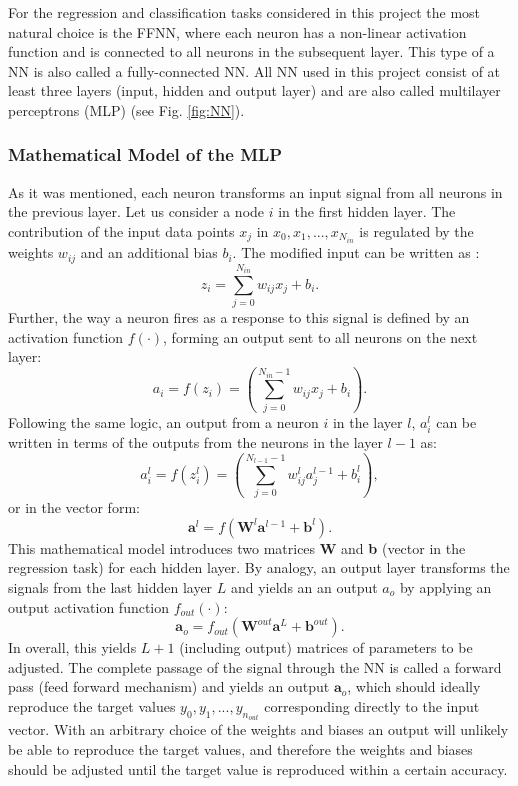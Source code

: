 \documentclass{emulateapj}
\begin{document}
For the regression and classification tasks considered in this project the most natural choice is the FFNN, where each neuron has a non-linear activation function and is connected to all neurons in the subsequent layer. This type of a NN is also called a fully-connected NN. All NN used in this project consist of at least three layers (input, hidden and output layer) and are also called multilayer perceptrons (MLP) (see Fig. \ref{fig:NN}).

\subsubsection{Mathematical Model of the MLP}
\label{subsubsec: MLP}

As it was mentioned, each neuron transforms an input signal from all neurons in the previous layer. Let us consider a node $i$ in the first hidden layer. The contribution of the input data points $x_j$ in $x_0, x_1, ..., x_{N_{in}}$ is regulated by the weights $w_{ij}$ and an additional bias $b_i$. The modified input can be written as \cite{Morten}:
\begin{equation}
\label{eq: 1}
    z_i = \sum_{j=0}^{N_{in}}w_{ij}x_j +b_i.
\end{equation}
Further, the way a neuron fires as a response to this signal is defined by an activation function $f(\cdot)$, forming an output sent to all neurons on the next layer:
\begin{equation}
    a_i = f\left(z_i\right)=\left(\sum_{j=0}^{N_{in}-1}w_{ij}x_j +b_i\right).
\end{equation}
Following the same logic, an output from a neuron $i$ in the layer $l$, $a_i^l$ can be written in terms of the outputs from the neurons in the layer $l-1$ as:
\begin{equation}
    a_i^l = f\left(z_i^l\right)=\left(\sum_{j=0}^{N_{l-1}-1}w_{ij}^la_j^{l-1} +b_i^l\right),
\end{equation}
or in the vector form:
\begin{equation}
    \textbf{a}^l=f(\textbf{W}^l\textbf{a}^{l-1}+\textbf{b}^l).
\end{equation}
This mathematical model introduces two matrices \textbf{W} and \textbf{b} (vector in the regression task) for each hidden layer. By analogy, an output layer transforms the signals from the last hidden layer $L$ and yields an an output $a_o$ by applying an output activation function $f_{out}(\cdot)$:
\begin{equation}
    \textbf{a}_o=f_{out}(\textbf{W}^{out}\textbf{a}^{L}+\textbf{b}^{out}).
\end{equation}
In overall, this yields $L+1$ (including output) matrices of parameters to be adjusted. The complete passage of the signal through the NN is called a forward pass (feed forward mechanism) and yields an output $\textbf{a}_o$, which should ideally reproduce the target values $y_0,y_1,...,y_{n_{out}}$ corresponding directly to the input vector. With an arbitrary choice of the weights and biases an output will unlikely be able to reproduce the target values, and therefore the weights and biases should be adjusted until the target value is reproduced within a certain accuracy.
\end{document}
